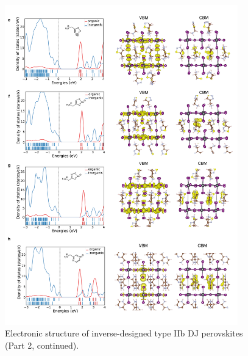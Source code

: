 \begin{figure}[htbp]
    \ContinuedFloat
    \centering
    \includegraphics[width=0.9\textwidth]{figures/synthesis-feasibility/figure5-25-2.png}
    \caption{Electronic structure of inverse-designed type IIb DJ perovskites (Part 2, continued).}
\end{figure}

